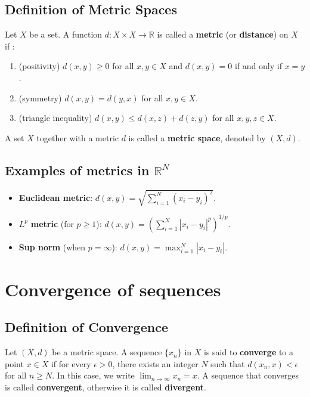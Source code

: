\subsection{Definition of Metric Spaces}
\begin{definition}
    Let $X$ be a set. A function $d: X \times X \rightarrow \mathbb{R}$ is called a \textbf{metric} (or \textbf{distance}) on $X$ if :
    \begin{enumerate}
        \item (positivity) $d(x,y) \geq 0$ for all $x,y \in X$ and $d(x,y) = 0$ if and only if $x = y$.
        \item (symmetry) $d(x,y) = d(y,x)$ for all $x,y \in X$.
        \item (triangle inequality) $d(x,y) \leq d(x,z) + d(z,y)$ for all $x,y,z \in X$.
    \end{enumerate}
\end{definition}
A set $X$ together with a metric $d$ is called a \textbf{metric space}, denoted by $(X,d)$.

\subsection{Examples of metrics in $\mathbb{R}^N$}
\begin{itemize}
    \item \textbf{ Euclidean metric}: $d(x,y) = \sqrt{\sum_{i=1}^{N} (x_i - y_i)^2}$.
    \item $L^p$ \textbf{metric} (for $p\ge 1$): $d(x,y) = (\sum_{i=1}^{N} |x_i - y_i|^p)^{1/p}$.
    \item \textbf{Sup norm} (when $p=\infty$): $d(x,y) = \max_{i=1}^{N} |x_i - y_i|$.
\end{itemize}

\section{Convergence of sequences}
\subsection{Definition of Convergence}
\begin{definition}
    Let $(X,d)$ be a metric space. A sequence $\{x_n\}$ in $X$ is said to \textbf{converge} to a point $x \in X$ if for every $\epsilon > 0$, there exists an integer $N$ such that $d(x_n,x) < \epsilon$ for all $n \geq N$. In this case, we write $\lim_{n \rightarrow \infty} x_n = x$. A sequence that converges is called \textbf{convergent}, otherwise it is called \textbf{divergent}.
\end{definition}

